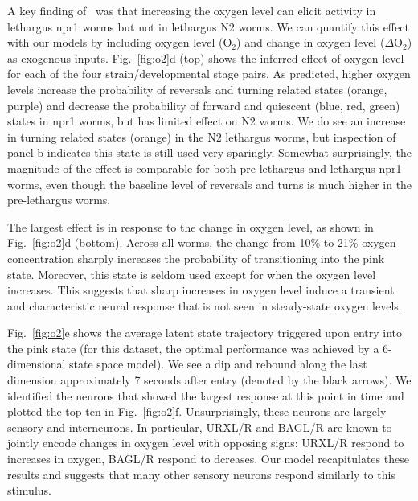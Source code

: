 \documentclass[11pt]{article}
\begin{document}
A key finding of~\citet{nichols2017global} was that increasing the
oxygen level can elicit activity in lethargus npr1 worms but not in
lethargus N2 worms. We can quantify this effect with our models by
including oxygen level (O$_2$) and change in oxygen level ($\Delta$O$_2$)
as exogenous inputs.
Fig.~\ref{fig:o2}d (top) shows the inferred effect of oxygen level for each
of the four strain/developmental stage pairs.  As predicted,
higher oxygen levels increase the probability of reversals and
turning related states (orange, purple) and decrease the probability
of forward and quiescent (blue, red, green) states in npr1 worms, but
has limited effect on N2 worms. We do see an increase in turning related
states (orange) in the N2 lethargus worms, but inspection of panel b
indicates this state is still used very sparingly.  Somewhat
surprisingly, the magnitude of the effect is comparable for both
pre-lethargus and lethargus npr1 worms, even though the baseline level
of reversals and turns is much higher in the pre-lethargus worms.

The largest effect is in response to the change in oxygen level, as
shown in Fig.~\ref{fig:o2}d (bottom).  Across all worms, the change
from 10\% to 21\% oxygen concentration sharply increases the probability
of transitioning into the pink state. Moreover, this state is seldom
used except for when the oxygen level increases.  This suggests that
sharp increases in oxygen level induce a transient and characteristic
neural response that is not seen in steady-state oxygen levels.

Fig.~\ref{fig:o2}e shows the average latent state trajectory triggered
upon entry into the pink state (for this dataset, the optimal performance
was achieved by a 6-dimensional state space model).  We see a dip and
rebound along the last dimension approximately 7 seconds after entry
(denoted by the black arrows).  We identified the neurons that showed
the largest response at this point in time and plotted the top ten
in Fig.~\ref{fig:o2}f.  Unsurprisingly, these neurons are largely sensory
and interneurons.  In particular, \textsf{URXL/R} and \textsf{BAGL/R} are
known to jointly encode changes in oxygen level with opposing signs: \textsf{URXL/R}
respond to increases in oxygen, \textsf{BAGL/R} respond to dcreases.  Our
model recapitulates these results and suggests that many other sensory
neurons respond similarly to this stimulus.
\end{document}
